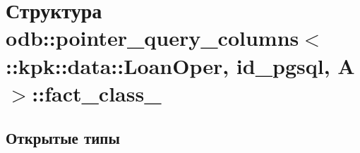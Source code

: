 \hypertarget{structodb_1_1pointer__query__columns_3_01_1_1kpk_1_1data_1_1_loan_oper_00_01id__pgsql_00_01_a_01_4_1_1fact__class__}{}\section{Структура odb\+:\+:pointer\+\_\+query\+\_\+columns$<$ \+:\+:kpk\+:\+:data\+:\+:Loan\+Oper, id\+\_\+pgsql, A $>$\+:\+:fact\+\_\+class\+\_\+}
\label{structodb_1_1pointer__query__columns_3_01_1_1kpk_1_1data_1_1_loan_oper_00_01id__pgsql_00_01_a_01_4_1_1fact__class__}
\subsection*{Открытые типы}
